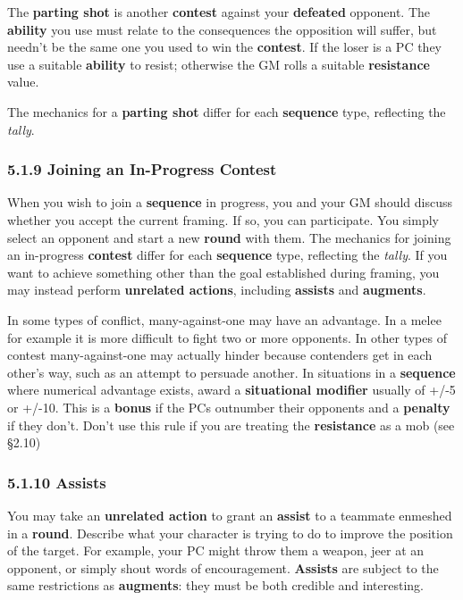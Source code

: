 \documentclass[
  11pt,
]{article}
\begin{document}
The \textbf{parting shot} is another \textbf{contest} against your
\textbf{defeated} opponent. The \textbf{ability} you use must relate to
the consequences the opposition will suffer, but needn't be the same one
you used to win the \textbf{contest}. If the loser is a PC they use a
suitable \textbf{ability} to resist; otherwise the GM rolls a suitable
\textbf{resistance} value.

The mechanics for a \textbf{parting shot} differ for each
\textbf{sequence} type, reflecting the \emph{tally}.

\hypertarget{joining-an-in-progress-contest}{%
\subsubsection{5.1.9 Joining an In-Progress
Contest}\label{joining-an-in-progress-contest}}

When you wish to join a \textbf{sequence} in progress, you and your GM
should discuss whether you accept the current framing. If so, you can
participate. You simply select an opponent and start a new
\textbf{round} with them. The mechanics for joining an in-progress
\textbf{contest} differ for each \textbf{sequence} type, reflecting the
\emph{tally}. If you want to achieve something other than the goal
established during framing, you may instead perform \textbf{unrelated
actions}, including \textbf{assists} and \textbf{augments}.

In some types of conflict, many-against-one may have an advantage. In a
melee for example it is more difficult to fight two or more opponents.
In other types of contest many-against-one may actually hinder because
contenders get in each other's way, such as an attempt to persuade
another. In situations in a \textbf{sequence} where numerical advantage
exists, award a \textbf{situational modifier} usually of +/-5 or +/-10.
This is a \textbf{bonus} if the PCs outnumber their opponents and a
\textbf{penalty} if they don't. Don't use this rule if you are treating
the \textbf{resistance} as a mob (see §2.10)

\hypertarget{assists}{%
\subsubsection{5.1.10 Assists}\label{assists}}

You may take an \textbf{unrelated action} to grant an \textbf{assist} to
a teammate enmeshed in a \textbf{round}. Describe what your character is
trying to do to improve the position of the target. For example, your PC
might throw them a weapon, jeer at an opponent, or simply shout words of
encouragement. \textbf{Assists} are subject to the same restrictions as
\textbf{augments}: they must be both credible and interesting.
\end{document}
